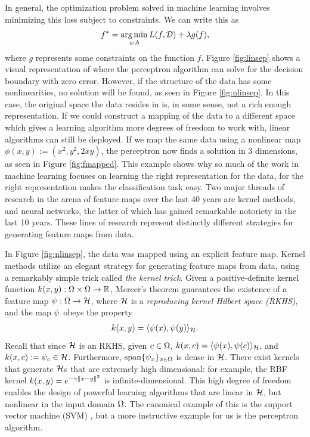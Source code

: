 In general, the optimization problem solved in machine learning involves minimizing this loss subject to constraints. We can write this as
\begin{align}
 f^* = \operatorname*{arg\,min}_{w,b} L(f, \mathcal{D}) + \lambda g(f),
\end{align}
where $g$ represents some constraints on the function $f$. 
Figure \ref{fig:linsep} shows a visual representation of where the perceptron algorithm can solve for the decision boundary with zero error. 
However, if the structure of the data has some nonlinearities, no solution will be found, as seen in Figure \ref{fig:nlinsep}. In this case,
the original space the data resides in is, in some sense, not a rich enough representation. If we could construct a mapping of the data to a
different space which gives a learning algorithm more degrees of freedom to work with, linear algorithms can still be deployed. 
If we map the same data using a nonlinear map $\phi(x,y):= (x^2, y^2, 2xy)$, the perceptron now finds a solution
in 3 dimensions, as seen in Figure \ref{fig:fmapped}. This example shows why so much of the work in machine learning focuses on 
learning the right representation for the data, for the right representation makes the classification task easy. Two major threads of 
research in the arena of feature maps over the last 40 years are kernel methods, and neural networks, the latter
of which has gained remarkable notoriety in the last 10 years. 
These lines of research represent distinctly different strategies for generating feature maps from data. 

In Figure \ref{fig:nlinsep}, the data was mapped using an explicit feature map. Kernel methods utilize an elegant strategy for generating
feature maps from data, using a remarkably simple trick called \emph{the kernel trick}. Given a positive-definite kernel function 
$k(x,y):\Omega\times\Omega\to\mathbb{R}$, Mercer's theorem guarantees the existence of a feature map $\psi:\Omega\to\mathcal{H}$, where $\mathcal{H}$
is a \emph{reproducing kernel Hilbert space (RKHS)}, and the map $\psi$ obeys the property 
\begin{align}\eqlabel{kmap}
 \kernel(x,y) = \l\fmap(x), \fmap(y)\r_{\fspace}.
\end{align}
Recall that since $\mathcal{H}$ is an RKHS, given $c\in\Omega$, $k(x, c) = \langle\psi(x), \psi(c)\rangle_{\mathcal{H}}$, 
and $k(x, c) := \psi_c\in\mathcal{H}$. Furthermore, $\operatorname{span}\{\psi_x\}_{x\in\Omega}$ is dense in $\mathcal{H}$. There exist kernels 
that generate $\mathcal{H}$s that are extremely high dimensional: for example, the RBF kernel $k(x,y) = e^{-\gamma\|x-y\|^2}$
is infinite-dimensional. This high degree of freedom enables the design of powerful learning algorithms that are linear in $\mathcal{H}$,
but nonlinear in the input domain $\Omega$. The canonical example of this is the support vector machine (SVM) \cite{cortes1995support},
but a more instructive example for us is the perceptron algorithm. 


